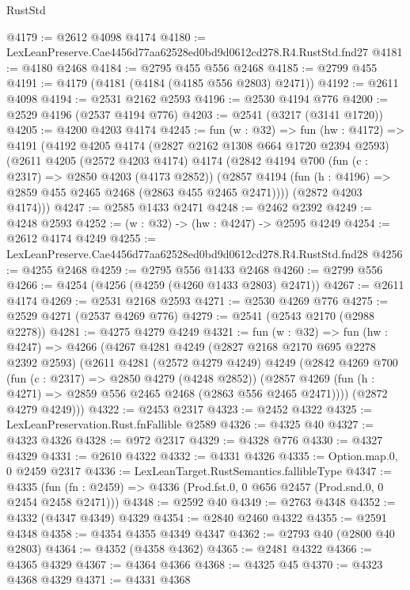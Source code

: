 \begin{lexlean}{RustStd}
\begin{coremodule}
@4179 := @2612 @4098 @4174
@4180 := LexLeanPreserve.Cae4456d77aa62528ed0bd9d0612cd278.R4.RustStd.fnd27
@4181 := @4180 @2468
@4184 := @2795 @455 @556 @2468
@4185 := @2799 @455
@4191 := @4179 (@4181 (@4184 (@4185 @556 @2803) @2471))
@4192 := @2611 @4098
@4194 := @2531 @2162 @2593
@4196 := @2530 @4194 @776
@4200 := @2529 @4196 (@2537 @4194 @776)
@4203 := @2541 (@3217 (@3141 @1720))
@4205 := @4200 @4203 @4174
@4245 := fun (w : @32) =>
  fun (hw : @4172) =>
  @4191
    (@4192
      @4205
      @4174
      (@2827 @2162 @1308 @664 @1720 @2394 @2593)
      (@2611
        @4205
        (@2572 @4203 @4174)
        @4174
        (@2842
          @4194
          @700
          (fun (c : @2317) => @2850 @4203 (@4173 @2852))
          (@2857 @4194 (fun (h : @4196) => @2859 @455 @2465 @2468 (@2863 @455 @2465 @2471))))
        (@2872 @4203 @4174)))
@4247 := @2585 @1433 @2471
@4248 := @2462 @2392
@4249 := @4248 @2593
@4252 := (w : @32) -> (hw : @4247) -> @2595 @4249
@4254 := @2612 @4174 @4249
@4255 := LexLeanPreserve.Cae4456d77aa62528ed0bd9d0612cd278.R4.RustStd.fnd28
@4256 := @4255 @2468
@4259 := @2795 @556 @1433 @2468
@4260 := @2799 @556
@4266 := @4254 (@4256 (@4259 (@4260 @1433 @2803) @2471))
@4267 := @2611 @4174
@4269 := @2531 @2168 @2593
@4271 := @2530 @4269 @776
@4275 := @2529 @4271 (@2537 @4269 @776)
@4279 := @2541 (@2543 @2170 (@2988 @2278))
@4281 := @4275 @4279 @4249
@4321 := fun (w : @32) =>
  fun (hw : @4247) =>
  @4266
    (@4267
      @4281
      @4249
      (@2827 @2168 @2170 @695 @2278 @2392 @2593)
      (@2611
        @4281
        (@2572 @4279 @4249)
        @4249
        (@2842
          @4269
          @700
          (fun (c : @2317) => @2850 @4279 (@4248 @2852))
          (@2857 @4269 (fun (h : @4271) => @2859 @556 @2465 @2468 (@2863 @556 @2465 @2471))))
        (@2872 @4279 @4249)))
@4322 := @2453 @2317
@4323 := @2452 @4322
@4325 := LexLeanPreservation.Rust.fnFallible @2589
@4326 := @4325 @40
@4327 := @4323 @4326
@4328 := @972 @2317
@4329 := @4328 @776
@4330 := @4327 @4329
@4331 := @2610 @4322
@4332 := @4331 @4326
@4335 := Option.map.{0, 0} @2459 @2317
@4336 := LexLeanTarget.RustSemantics.fallibleType
@4347 := @4335
    (fun (fn : @2459) => @4336 (Prod.fst.{0, 0} @656 @2457 (Prod.snd.{0, 0} @2454 @2458 @2471)))
@4348 := @2592 @40
@4349 := @2763 @4348
@4352 := @4332 (@4347 @4349) @4329
@4354 := @2840 @2460 @4322
@4355 := @2591 @4348
@4358 := @4354 @4355 @4349 @4347
@4362 := @2793 @40 (@2800 @40 @2803)
@4364 := @4352 (@4358 @4362)
@4365 := @2481 @4322
@4366 := @4365 @4329
@4367 := @4364 @4366
@4368 := @4325 @45
@4370 := @4323 @4368 @4329
@4371 := @4331 @4368

\end{coremodule}
\end{lexlean}
